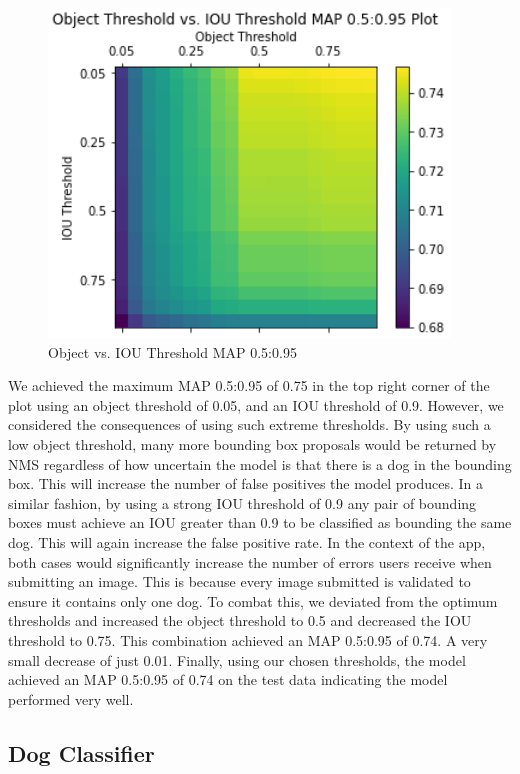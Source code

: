 \documentclass{article}
\begin{document}
\begin{enumerate}
\begin{figure}[h]
\centering
	\includegraphics[scale=0.7]{final-report-images/map0.5to0.95.png}
\caption{Object vs. IOU Threshold MAP 0.5:0.95}
\label{fig:x object v iou}
\end{figure}
\newpage
\noindent We achieved the maximum MAP 0.5:0.95 of 0.75 in the top right corner of the plot using an object threshold of 0.05, and an IOU threshold of 0.9.  However, we considered the consequences of using such extreme thresholds.  By using such a low object threshold, many more bounding box proposals would be returned by NMS regardless of how uncertain the model is that there is a dog in the bounding box.  This will increase the number of false positives the model produces.  In a similar fashion, by using a strong IOU threshold of 0.9 any pair of bounding boxes must achieve an IOU greater than 0.9 to be classified as bounding the same dog.  This will again increase the false positive rate.  In the context of the app, both cases would significantly increase the number of errors users receive when submitting an image.  This is because every image submitted is validated to ensure it contains only one dog.  To combat this, we deviated from the optimum thresholds and increased the object threshold to 0.5 and decreased the IOU threshold to 0.75.  This combination achieved an MAP 0.5:0.95 of 0.74.  A very small decrease of just 0.01.  Finally, using our chosen thresholds, the model achieved an MAP 0.5:0.95 of 0.74 on the test data indicating the model performed very well.

\subsection{Dog Classifier}


\end{enumerate}
\end{document}
